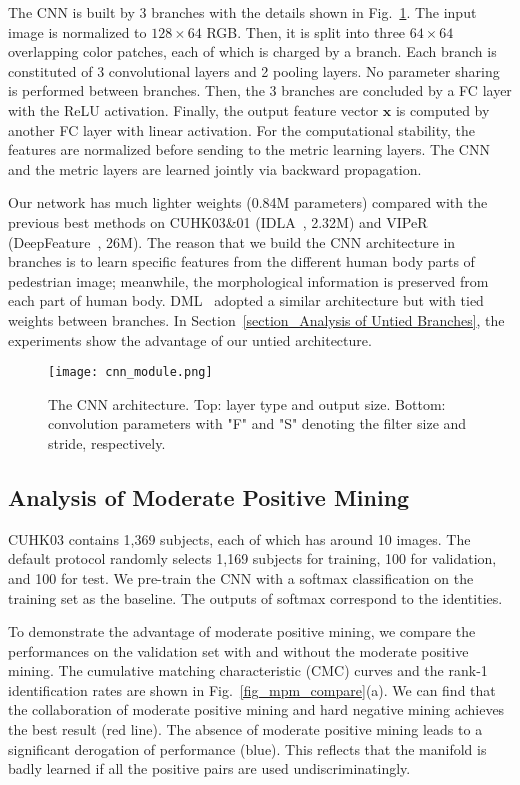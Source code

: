 \documentclass[runningheads]{llncs}
\begin{document}
The CNN is built by 3 branches with the details shown in Fig.~\ref{fig_CNN}.
The input image is normalized to $128\times64$ RGB. Then, it is split into three $64\times64$ overlapping color patches, each of which is charged by a branch. Each branch is constituted of 3 convolutional layers and 2 pooling layers. No parameter sharing is performed between branches. Then, the 3 branches are concluded by a FC layer with the ReLU activation. Finally, the output feature vector $\mathbf{x}$ is computed by another FC layer with linear activation.
For the computational stability, the features are normalized before sending to the metric learning layers.
The CNN and the metric layers are learned jointly via backward propagation.

Our network has much lighter weights (0.84M parameters) compared with the previous best methods on CUHK03\&01 (IDLA~\cite{ahmed2015improved}, 2.32M) and VIPeR (DeepFeature~\cite{ding2015deep}, 26M).
The reason that we build the CNN architecture in branches is to learn specific features from the different human body parts of pedestrian image; meanwhile, the morphological information is preserved from each part of human body.
DML~\cite{yi2014deep} adopted a similar architecture but with tied weights between branches.
In Section~\ref{section_Analysis of Untied Branches}, the experiments show the advantage of our untied architecture.



\begin{figure}[!htb]
  \centering
  \texttt{[image: cnn\_module.png]}
  \caption{The CNN architecture. Top: layer type and output size. Bottom: convolution parameters with "F" and "S" denoting the filter size and stride, respectively.}
  \label{fig_CNN}
\end{figure}



\subsection{Analysis of Moderate Positive Mining}
\label{section_Analysis of Moderate Positive Mining}

CUHK03 contains 1,369 subjects, each of which has around 10 images.
The default protocol randomly selects 1,169 subjects for training, 100 for validation, and 100 for test.
We pre-train the CNN with a softmax classification on the training set as the baseline.
The outputs of softmax correspond to the identities.

To demonstrate the advantage of moderate positive mining, we compare the performances on the validation set with and without the moderate positive mining.
The cumulative matching characteristic (CMC) curves and the rank-1 identification rates are shown in Fig.~\ref{fig_mpm_compare}(a).
We can find that the collaboration of moderate positive mining and hard negative mining achieves the best result (red line).
The absence of moderate positive mining leads to a significant derogation of performance (blue).
This reflects that the manifold is badly learned if all the positive pairs are used undiscriminatingly.
\end{document}
